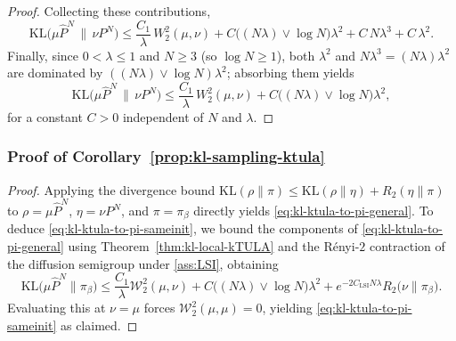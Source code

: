 \documentclass[11pt,a4paper,reqno]{amsart}
\theoremstyle{plain}
\theoremstyle{definition}
\theoremstyle{remark}
\newcommand{\KL}{\mathrm{KL}}
\newcommand{\W}{\mathcal{W}_2}
\begin{document}
\begin{proof}
Collecting these contributions,
\[
  \KL\!\bigl(\mu\widehat P^{N}\,\big\|\,\nu P^{N}\bigr)
  \le
  \frac{C_1}{\lambda}\,W_2^2(\mu,\nu)
  +C\bigl((N\lambda)\vee\log N\bigr)\lambda^2
  +C\,N\lambda^3
  +C\,\lambda^2.
\]
Finally, since $0<\lambda\le1$ and $N\ge3$ (so $\log N\ge1$), both $\lambda^2$
and $N\lambda^3=(N\lambda)\lambda^2$ are dominated by
$((N\lambda)\vee\log N)\lambda^2$; absorbing them yields
\[
  \KL\!\bigl(\mu\widehat P^{N}\,\big\|\,\nu P^{N}\bigr)
  \le
  \frac{C_1}{\lambda}\,W_2^2(\mu,\nu)
  +C\bigl((N\lambda)\vee\log N\bigr)\lambda^2,
\]
for a constant $C>0$ independent of $N$ and $\lambda$.
\end{proof}



\subsubsection{Proof of Corollary~\ref{prop:kl-sampling-ktula}}
\label{proof:kl-sampling-ktula}
\begin{proof}
Applying the divergence bound $\KL(\rho\|\pi)\le \KL(\rho\|\eta)+R_2(\eta\|\pi)$ to $\rho=\mu\widehat P^N$, $\eta=\nu P^N$, and $\pi=\pi_\beta$ directly yields \eqref{eq:kl-ktula-to-pi-general}. To deduce \eqref{eq:kl-ktula-to-pi-sameinit}, we bound the components of \eqref{eq:kl-ktula-to-pi-general} using Theorem~\ref{thm:kl-local-kTULA} and the Rényi-$2$ contraction of the diffusion semigroup under \ref{ass:LSI}, obtaining
\[
\KL\!\bigl(\mu\widehat P^N\|\pi_\beta\bigr)
\le
\frac{C_1}{\lambda}\W^2(\mu,\nu)
+
C\bigl((N\lambda)\vee\log N\bigr)\lambda^2
+
e^{-2C_{\mathrm{LSI}}N\lambda} R_2\!\bigl(\nu\|\pi_\beta\bigr).
\]
Evaluating this at $\nu=\mu$ forces $\W^2(\mu,\mu)=0$, yielding \eqref{eq:kl-ktula-to-pi-sameinit} as claimed.
\end{proof}
\end{document}
